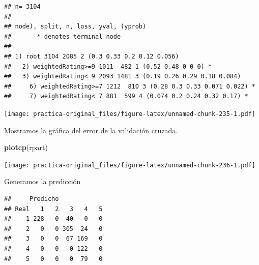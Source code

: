\documentclass[spanish,]{article}
\newenvironment{Shaded}{\begin{snugshade}}{\end{snugshade}}
\newcommand{\KeywordTok}[1]{\textcolor[rgb]{0.13,0.29,0.53}{\textbf{#1}}}
\newcommand{\DataTypeTok}[1]{\textcolor[rgb]{0.13,0.29,0.53}{#1}}
\newcommand{\StringTok}[1]{\textcolor[rgb]{0.31,0.60,0.02}{#1}}
\newcommand{\CommentTok}[1]{\textcolor[rgb]{0.56,0.35,0.01}{\textit{#1}}}
\newcommand{\OperatorTok}[1]{\textcolor[rgb]{0.81,0.36,0.00}{\textbf{#1}}}
\newcommand{\NormalTok}[1]{#1}
\begin{document}
\begin{verbatim}
## n= 3104 
## 
## node), split, n, loss, yval, (yprob)
##       * denotes terminal node
## 
## 1) root 3104 2085 2 (0.3 0.33 0.2 0.12 0.056)  
##   2) weightedRating>=9 1011  482 1 (0.52 0.48 0 0 0) *
##   3) weightedRating< 9 2093 1481 3 (0.19 0.26 0.29 0.18 0.084)  
##     6) weightedRating>=7 1212  810 3 (0.28 0.3 0.33 0.071 0.022) *
##     7) weightedRating< 7 881  599 4 (0.074 0.2 0.24 0.32 0.17) *
\end{verbatim}

\begin{Shaded}
\end{Shaded}

\texttt{[image: practica-original\_files/figure-latex/unnamed-chunk-235-1.pdf]}

Mostramos la gráfica del error de la validación cruzada.

\begin{Shaded}
\begin{Highlighting}[]
\KeywordTok{plotcp}\NormalTok{(rpart)}
\end{Highlighting}
\end{Shaded}

\texttt{[image: practica-original\_files/figure-latex/unnamed-chunk-236-1.pdf]}

Generamos la predicción

\begin{Shaded}
\end{Shaded}

\begin{verbatim}
##     Predicho
## Real   1   2   3   4   5
##    1 228   0  40   0   0
##    2   0   0 305  24   0
##    3   0   0  67 169   0
##    4   0   0   0 122   0
##    5   0   0   0  79   0
\end{verbatim}
\end{document}
